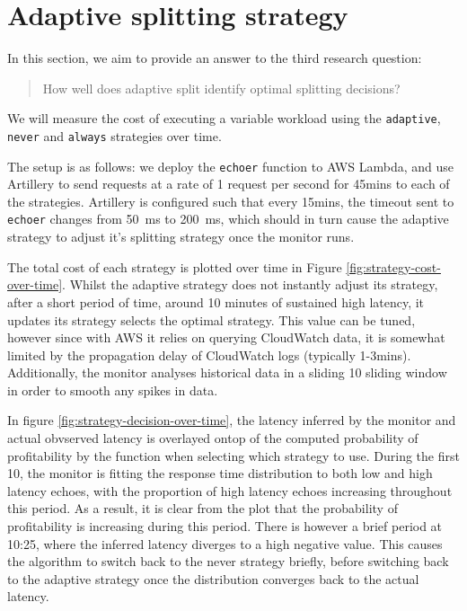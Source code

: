 \section{Adaptive splitting strategy}
In this section, we aim to provide an answer to the third research question: \blockquote{How well does adaptive split identify optimal splitting decisions?} We will measure the cost of executing a variable workload using the \verb|adaptive|, \verb|never| and \verb|always| strategies over time.

The setup is as follows: we deploy the \verb|echoer| function to AWS Lambda, and use Artillery\cite{artilleryArtilleryCloudscaleLoad} to send requests at a rate of 1 request per second for 45mins to each of the strategies. Artillery is configured such that every 15mins, the timeout sent to \verb|echoer| changes from \SI{50}{\milli\second} to \SI{200}{\milli\second}, which should in turn cause the adaptive strategy to adjust it's splitting strategy once the monitor runs.

The total cost of each strategy is plotted over time in Figure \ref{fig:strategy-cost-over-time}. Whilst the adaptive strategy does not instantly adjust its strategy, after a short period of time, around 10 minutes of sustained high latency, it updates its strategy selects the optimal strategy. This value can be tuned, however since with AWS it relies on querying CloudWatch data, it is somewhat limited by the propagation delay of CloudWatch logs (typically 1-3mins). Additionally, the monitor analyses historical data in a sliding \SI{10}{\min} sliding window in order to smooth any spikes in data.

\begin{figure*}
    \begin{center}
        
    \end{center}
    \caption{Strategy cost over time.}
    \label{fig:strategy-cost-over-time}
\end{figure*}

In figure \ref{fig:strategy-decision-over-time}, the latency inferred by the monitor and actual obvserved latency is overlayed ontop of the computed probability of profitability by the function when selecting which strategy to use. During the first \SI{10}{\min}, the monitor is fitting the response time distribution to both low and high latency echoes, with the proportion of high latency echoes increasing throughout this period. As a result, it is clear from the plot that the probability of profitability is increasing during this period. There is however a brief period at 10:25, where the inferred latency diverges to a high negative value. This causes the algorithm to switch back to the never strategy briefly, before switching back to the adaptive strategy once the distribution converges back to the actual latency.

